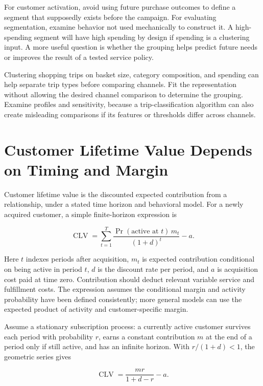 For customer activation, avoid using future purchase outcomes to define
a segment that supposedly exists before the campaign. For evaluating
segmentation, examine behavior not used mechanically to construct it. A
high-spending segment will have high spending by design if spending is a
clustering input. A more useful question is whether the grouping helps
predict future needs or improves the result of a tested service policy.

Clustering shopping trips on basket size, category composition, and
spending can help separate trip types before comparing channels. Fit the
representation without allowing the desired channel comparison to
determine the grouping. Examine profiles and sensitivity, because a
trip-classification algorithm can also create misleading comparisons if
its features or thresholds differ across channels.

\hypertarget{M04-customer-lifetime-value-depends-on-timing-and-margin}{%
\section{Customer Lifetime Value Depends on Timing and
Margin}\label{M04-customer-lifetime-value-depends-on-timing-and-margin}}

\noindent Customer lifetime value is the discounted expected contribution from a
relationship, under a stated time horizon and behavioral model. For a
newly acquired customer, a simple finite-horizon expression is

\[
\operatorname{CLV}=\sum_{t=1}^{T}\frac{\Pr(\text{active at }t)\,m_t}{(1+d)^t}-a.
\]

Here \(t\) indexes periods after acquisition, \(m_t\) is expected
contribution conditional on being active in period \(t\), \(d\) is the
discount rate per period, and \(a\) is acquisition cost paid at time
zero. Contribution should deduct relevant variable service and
fulfillment costs. The expression assumes the conditional margin and
activity probability have been defined consistently; more general models
can use the expected product of activity and customer-specific margin.

Assume a stationary subscription process: a currently active customer
survives each period with probability \(r\), earns a constant
contribution \(m\) at the end of a period only if still active, and has
an infinite horizon. With \(r/(1+d)<1\), the geometric series gives

\[
\operatorname{CLV}=\frac{mr}{1+d-r}-a.
\]

